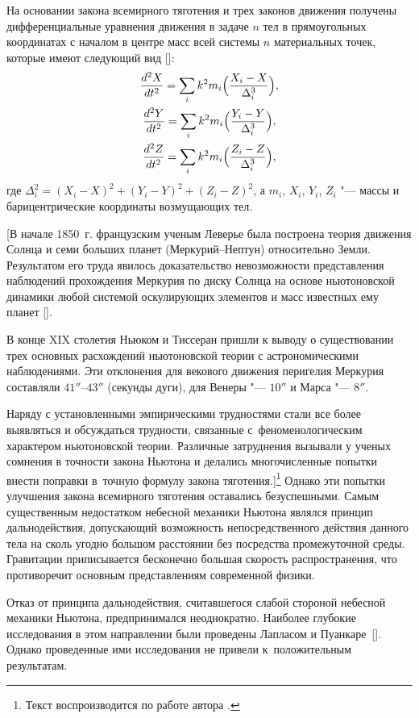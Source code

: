 На основании закона всемирного тяготения и трех законов движения получены дифференциальные уравнения движения в задаче $n$ тел в прямоугольных координатах с началом в центре масс всей системы $n$ материальных точек, которые имеют следующий вид []:
\begin{gather}
\frac{d^2X}{dt^2}=\sum_i k^2 m_i \Bigl(\frac{X_i-X}{\Delta_i^3}\Bigr),\\
\frac{d^2Y}{dt^2}=\sum_i k^2 m_i \Bigl(\frac{Y_i-Y}{\Delta_i^3}\Bigr),\\
\label{zaus:eq1}
\frac{d^2Z}{dt^2}=\sum_i k^2 m_i \Bigl(\frac{Z_i-Z}{\Delta_i^3}\Bigr),
\end{gather}
где $\Delta_i^2=(X_i-X)^2+(Y_i-Y)^2+(Z_i-Z)^2$, а $m_i$, $X_i$, $Y_i$, $Z_i$  "--- массы и барицентрические координаты возмущающих тел.

[В начале 1850~г. французским ученым Леверье была построена теория движения Солнца и семи больших планет (Меркурий--Нептун) относительно Земли. 
Результатом его труда явилось доказательство невозможности представления наблюдений прохождения Меркурия по диску Солнца на основе ньютоновской динамики любой системой оскулирующих элементов и масс известных ему планет [].

В конце XIX столетия Ньюком и Тиссеран пришли к выводу о существовании трех основных расхождений ньютоновской теории с астрономическими наблюдениями. Эти отклонения для векового движения перигелия Меркурия составляли $41''$--$43''$ (секунды дуги), для Венеры "--- $10''$ и Марса "--- $8''$.

Наряду с установленными эмпирическими трудностями стали все более выявляться и обсуждаться трудности, связанные с~феноменологическим характером ньютоновской теории. 
Различные затруднения вызывали у ученых сомнения в точности закона Ньютона и делались многочисленные попытки внести поправки в~точную формулу закона тяготения.]\footnote{Текст воспроизводится  по работе автора \cite{zaus:13}.} 
Однако эти попытки улучшения закона всемирного тяготения оставались безуспешными. 
Самым существенным недостатком небесной механики Ньютона являлся принцип дальнодействия, допускающий возможность непосредственного действия данного тела на сколь угодно большом расстоянии  без посредства промежуточной среды. 
Гравитации приписывается бесконечно большая скорость распространения, что противоречит основным представлениям современной физики.

Отказ от принципа дальнодействия, считавшегося слабой стороной небесной механики Ньютона, предпринимался неоднократно. Наиболее глубокие исследования в этом направлении были проведены Лапласом и Пуанкаре~[]. 
Однако проведенные ими исследования не привели к~положительным результатам.


